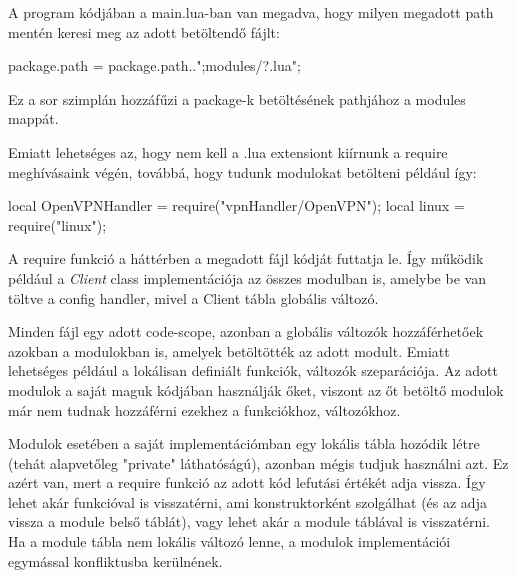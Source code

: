 A program kódjában a main.lua-ban van megadva, hogy milyen megadott path mentén keresi meg az adott betöltendő fájlt:

\begin{lua}
package.path = package.path..";modules/?.lua";
\end{lua}

Ez a sor szimplán hozzáfűzi a package-k betöltésének pathjához a modules mappát.

Emiatt lehetséges az, hogy nem kell a .lua extensiont kiírnunk a require meghívásaink végén, továbbá, hogy tudunk modulokat betölteni például így:
\begin{lua}
local OpenVPNHandler = require("vpnHandler/OpenVPN");
local linux = require("linux");
\end{lua}

A require funkció a háttérben a megadott fájl kódját futtatja le. Így működik például a \textit{Client} class implementációja az összes modulban is, amelybe be van töltve a config handler, mivel a Client tábla globális változó. 

Minden fájl egy adott code-scope, azonban a globális változók hozzáférhetőek azokban a modulokban is, amelyek betöltötték az adott modult. Emiatt lehetséges például a lokálisan definiált funkciók, változók szeparációja. Az adott modulok a saját maguk kódjában használják őket, viszont az őt betöltő modulok már nem tudnak hozzáférni ezekhez a funkciókhoz, változókhoz.

Modulok esetében a saját implementációmban egy lokális tábla hozódik létre (tehát alapvetőleg "private" láthatóságú), azonban mégis tudjuk használni azt. Ez azért van, mert a require funkció az adott kód lefutási értékét adja vissza. Így lehet akár funkcióval is visszatérni, ami konstruktorként szolgálhat (és az adja vissza a module belső táblát), vagy lehet akár a module táblával is visszatérni. Ha a module tábla nem lokális változó lenne, a modulok implementációi egymással konfliktusba kerülnének.